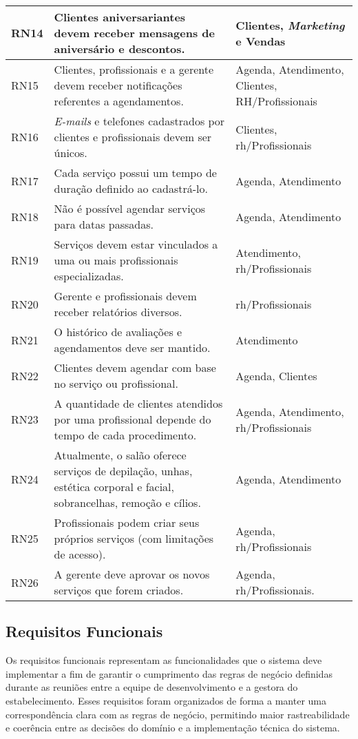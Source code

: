 \begin{longtable}{|p{1.2cm}|p{10cm}|p{4cm}|}
	\hline
	RN14 & Clientes aniversariantes devem receber mensagens de aniversário e descontos. & Clientes, \emph{Marketing} e Vendas \\
	\hline
	RN15 & Clientes, profissionais e a gerente devem receber notificações referentes a agendamentos. & Agenda, Atendimento, Clientes, RH/Profissionais \\
	\hline
	RN16 & \emph{E-mails} e telefones cadastrados por clientes e profissionais devem ser únicos. & Clientes, \gls{rh}/Profissionais \\
	\hline
	RN17 & Cada serviço possui um tempo de duração definido ao cadastrá-lo. & Agenda, Atendimento \\
	\hline
	RN18 & Não é possível agendar serviços para datas passadas. & Agenda, Atendimento \\
	\hline
	RN19 & Serviços devem estar vinculados a uma ou mais profissionais especializadas. & Atendimento, \gls{rh}/Profissionais \\
	\hline
	RN20 & Gerente e profissionais devem receber relatórios diversos. & \gls{rh}/Profissionais \\
	\hline
	RN21 & O histórico de avaliações e agendamentos deve ser mantido. & Atendimento \\
	\hline
	RN22 & Clientes devem agendar com base no serviço ou profissional. & Agenda, Clientes \\
	\hline
	RN23 & A quantidade de clientes atendidos por uma profissional depende do tempo de cada procedimento. & Agenda, Atendimento, \gls{rh}/Profissionais \\
	\hline
	RN24 & Atualmente, o salão oferece serviços de depilação, unhas, estética corporal e facial, sobrancelhas, remoção e cílios. & Agenda, Atendimento \\
	\hline
	RN25 & Profissionais podem criar seus próprios serviços (com limitações de acesso). & Agenda, \gls{rh}/Profissionais \\
	\hline
	RN26 & A gerente deve aprovar os novos serviços que forem criados. & Agenda, \gls{rh}/Profissionais. \\
	\hline
	
\end{longtable}

\subsection{Requisitos Funcionais}

Os requisitos funcionais representam as funcionalidades que o sistema deve implementar a fim de garantir o cumprimento das regras de negócio definidas durante as reuniões entre a equipe de desenvolvimento e a gestora do estabelecimento. Esses requisitos foram organizados de forma a manter uma correspondência clara com as regras de negócio, permitindo maior rastreabilidade e coerência entre as decisões do domínio e a implementação técnica do sistema.

